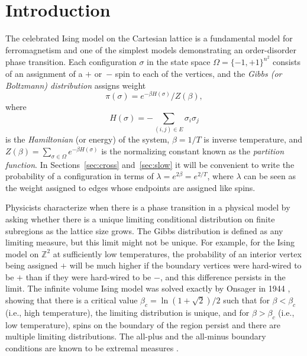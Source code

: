\documentclass[letterpaper,english,numberwithinsect]{amsart}
\newcommand{\Z}{\ensuremath{\mathbb Z}}
\begin{document}
\newpage
\setcounter{page}{1}

\section{Introduction}
The celebrated Ising model on the Cartesian lattice is a
fundamental  model for ferromagnetism and one of the simplest models demonstrating an order-disorder phase transition. Each configuration
$\sigma$ in the state space $\Omega= \{-1,+1\}^{n^2}$ consists of an
assignment of a $+$ or~$-$ spin to each of the vertices, and the {\it
 Gibbs (or Boltzmann) distribution} assigns weight 
$$ \pi(\sigma) = e^{-\beta H(\sigma)}/Z(\beta),$$
where 
$$H(\sigma) = - \sum_{(i,j)\in E} \sigma_i \sigma_j $$ is the {\it Hamiltonian} (or energy) of the system, $\beta = 1/T$ is inverse temperature, and 
 $Z(\beta) = \sum_{\sigma \in \Omega} e^{-\beta H(\sigma)}$ is the normalizing constant known as the {\it partition function}.  
In Sections~\ref{sec:cross} and~\ref{sec:slow} it will be convenient to write the probability of a configuration in terms of $\lambda = e^{2\beta} = e^{2/T}$, where $\lambda$ can be seen as the weight assigned to edges whose endpoints are assigned like spins.



Physicists characterize when there is a phase transition in a physical model 
by asking whether there is a unique limiting conditional distribution on finite subregions as the lattice size grows. The Gibbs distribution is defined as any limiting measure, but this limit might not be unique.  For example, for the Ising model on $\Z^2$ at sufficiently low temperatures, the probability of an interior vertex being assigned $+$ will be much higher if the boundary vertices were hard-wired to be $+$ than if they were hard-wired to be $-$, and this difference  persists in the limit.
The infinite volume Ising model was solved exactly by Onsager in 1944 \cite{onsager}, showing that there
is a critical value $\beta_c = \ln(1+\sqrt{2})/2$ such that for $\beta < \beta_c$ (i.e., high temperature),
the limiting distribution is unique, and for $\beta > \beta_c$ (i.e., low temperature),
spins on the boundary
of the region persist and there are multiple
limiting distributions. 
The all-plus and the all-minus boundary conditions are known to be extremal measures \cite{aiz, hig}.
\end{document}
